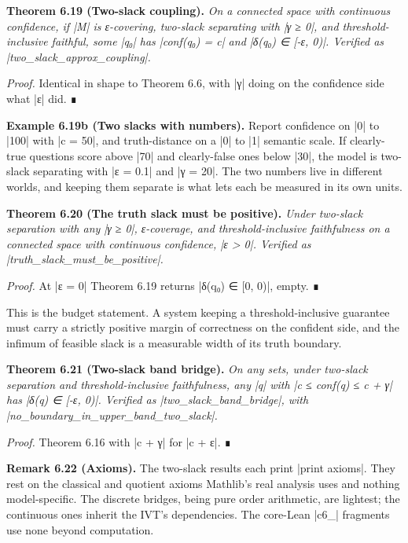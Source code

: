 \documentclass{memoir}
\begin{document}
\textbf{Theorem 6.19 (Two-slack coupling).} \emph{On a connected space with continuous
confidence, if \LeanVerb|M| is ε-covering, two-slack separating with \LeanVerb|γ ≥ 0|, and
threshold-inclusive faithful, some \LeanVerb|q₀| has \LeanVerb|conf(q₀) = c| and \LeanVerb|δ(q₀) ∈ [-ε, 0)|.
Verified as \LeanVerb|two_slack_approx_coupling|.}

\emph{Proof.} Identical in shape to Theorem 6.6, with \LeanVerb|γ| doing on the confidence side
what \LeanVerb|ε| did. ∎

\textbf{Example 6.19b (Two slacks with numbers).} Report confidence on \LeanVerb|0| to \LeanVerb|100| with
\LeanVerb|c = 50|, and truth-distance on a \LeanVerb|0| to \LeanVerb|1| semantic scale. If clearly-true
questions score above \LeanVerb|70| and clearly-false ones below \LeanVerb|30|, the model is
two-slack separating with \LeanVerb|ε = 0.1| and \LeanVerb|γ = 20|. The two numbers live in
different worlds, and keeping them separate is what lets each be measured in its
own units.

\textbf{Theorem 6.20 (The truth slack must be positive).} \emph{Under two-slack separation with
any \LeanVerb|γ ≥ 0|, ε-coverage, and threshold-inclusive faithfulness on a connected
space with continuous confidence, \LeanVerb|ε > 0|. Verified as
\LeanVerb|truth_slack_must_be_positive|.}

\emph{Proof.} At \LeanVerb|ε = 0| Theorem 6.19 returns \LeanVerb|δ(q₀) ∈ [0, 0)|, empty. ∎

This is the budget statement. A system keeping a threshold-inclusive guarantee
must carry a strictly positive margin of correctness on the confident side, and
the infimum of feasible slack is a measurable width of its truth boundary.

\textbf{Theorem 6.21 (Two-slack band bridge).} \emph{On any sets, under two-slack separation and
threshold-inclusive faithfulness, any \LeanVerb|q| with \LeanVerb|c ≤ conf(q) ≤ c + γ| has \LeanVerb|δ(q) ∈ [-ε, 0)|.
Verified as \LeanVerb|two_slack_band_bridge|, with
\LeanVerb|no_boundary_in_upper_band_two_slack|.}

\emph{Proof.} Theorem 6.16 with \LeanVerb|c + γ| for \LeanVerb|c + ε|. ∎

\textbf{Remark 6.22 (Axioms).} The two-slack results each print \LeanVerb|print axioms|. They rest
on the classical and quotient axioms Mathlib's real analysis uses and nothing
model-specific. The discrete bridges, being pure order arithmetic, are lightest;
the continuous ones inherit the IVT's dependencies. The core-Lean \LeanVerb|c6_|
fragments use none beyond computation.
\end{document}
